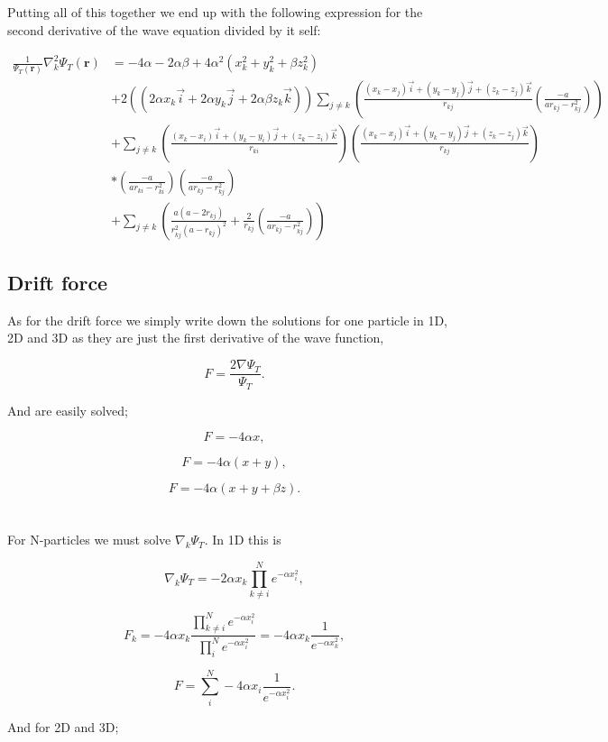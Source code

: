 Putting all of this together we end up with the following expression for the second derivative of the wave equation divided by it self:

\begin{align*}
\frac{1}{\Psi_T(\mathbf{r})}\nabla_k^2 \Psi_T(\mathbf{r}) &= -4\alpha - 2\alpha \beta + 4\alpha^2(x_k^2 + y_k^2 + \beta z_k^2) \\
&+ 2((2\alpha x_k \vec{i} + 2\alpha y_k \vec{j} + 2\alpha \beta z_k \vec{k})) \sum_{j \ne k} \left( \frac{(x_k - x_j)\vec{i} + (y_k - y_j)\vec{j} + (z_k - z_j)\vec{k}}{r_{kj}} \left( \frac{-a}{ar_{kj} - r_{kj}^2} \right) \right)\\
&+ \sum_{j \ne k} \left( \frac{(x_k - x_i)\vec{i} + (y_k - y_i)\vec{j} + (z_k - z_i)\vec{k}}{r_{ki}} \right) \left( \frac{(x_k - x_j)\vec{i} + (y_k - y_j)\vec{j} + (z_k - z_j)\vec{k}}{r_{kj}} \right) \\
&* \left( \frac{-a}{ar_{ki} - r_{ki}^2} \right) \left( \frac{-a}{ar_{kj} - r_{kj}^2} \right)\\
&+ \sum_{j \ne k} \left( \frac{a(a - 2r_{kj})}{r_{kj}^2(a - r_{kj})^2} + \frac{2}{r_{kj}} \left(\frac{-a}{ar_{kj} - r_{kj}^2}\right) \right)
\end{align*}


\subsection{Drift force}
As for the drift force we simply write down the solutions for one particle in 1D, 2D and 3D as they are just the first derivative of the wave function,

$$F = \frac{2 \nabla \Psi_T}{\Psi_T}.$$

And are easily solved;

$$F = -4 \alpha x,$$

$$F = -4 \alpha (x + y),$$

$$F = -4 \alpha (x + y + \beta z).$$
\\
\\
For N-particles we must solve $\nabla_k \Psi_T$. In 1D this is

$$\nabla_k \Psi_T = -2 \alpha x_k \prod_{k \ne i}^N e^{-\alpha x_i^2},$$

$$F_k = -4\alpha x_k \frac{\prod_{k \ne i}^N e^{-\alpha x_i^2}}{\prod_{i}^N e^{-\alpha x_i^2}} = -4\alpha x_k \frac{1}{e^{-\alpha x_k^2}},$$

$$F = \sum_i^N -4\alpha x_i \frac{1}{e^{-\alpha x_i^2}}.$$

And for 2D and 3D; 

